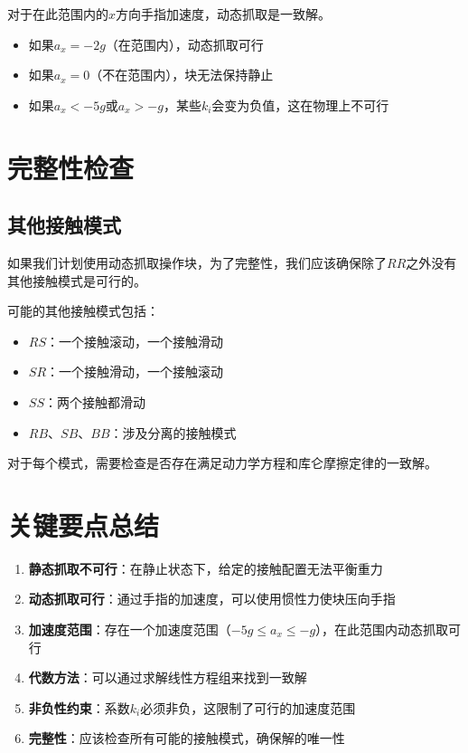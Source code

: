 \documentclass[12pt,a4paper]{article}
\begin{document}
对于在此范围内的$\hat{x}$方向手指加速度，动态抓取是一致解。

\begin{itemize}
    \item 如果$a_x = -2g$（在范围内），动态抓取可行
    \item 如果$a_x = 0$（不在范围内），块无法保持静止
    \item 如果$a_x < -5g$或$a_x > -g$，某些$k_i$会变为负值，这在物理上不可行
\end{itemize}

\section{完整性检查}

\subsection{其他接触模式}

如果我们计划使用动态抓取操作块，为了完整性，我们应该确保除了$RR$之外没有其他接触模式是可行的。

可能的其他接触模式包括：
\begin{itemize}
    \item $RS$：一个接触滚动，一个接触滑动
    \item $SR$：一个接触滑动，一个接触滚动
    \item $SS$：两个接触都滑动
    \item $RB$、$SB$、$BB$：涉及分离的接触模式
\end{itemize}

对于每个模式，需要检查是否存在满足动力学方程和库仑摩擦定律的一致解。

\section{关键要点总结}

\begin{enumerate}
    \item \textbf{静态抓取不可行}：在静止状态下，给定的接触配置无法平衡重力
    
    \item \textbf{动态抓取可行}：通过手指的加速度，可以使用惯性力使块压向手指
    
    \item \textbf{加速度范围}：存在一个加速度范围（$-5g \leq a_x \leq -g$），在此范围内动态抓取可行
    
    \item \textbf{代数方法}：可以通过求解线性方程组来找到一致解
    
    \item \textbf{非负性约束}：系数$k_i$必须非负，这限制了可行的加速度范围
    
    \item \textbf{完整性}：应该检查所有可能的接触模式，确保解的唯一性
\end{enumerate}
\end{document}
